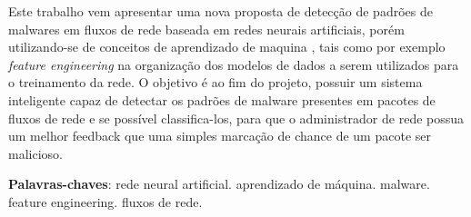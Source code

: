 \begin{resumo}

 Este trabalho vem apresentar uma nova proposta de detecção de padrões de malwares em fluxos de rede baseada em redes neurais artificiais, porém utilizando-se de conceitos de aprendizado de maquina , tais como por exemplo \textit{feature engineering} na organização dos modelos de dados a serem utilizados para o treinamento da rede. O objetivo é ao fim do projeto, possuir um sistema inteligente capaz de detectar os padrões de malware presentes em pacotes de fluxos de rede e se possível classifica-los, para que o administrador de rede possua um melhor feedback que uma simples marcação de chance de um pacote ser malicioso.

 \vspace{\onelineskip}

 \noindent
 \textbf{Palavras-chaves}: rede neural artificial. aprendizado de máquina. malware. feature engineering. fluxos de rede.
\end{resumo}
